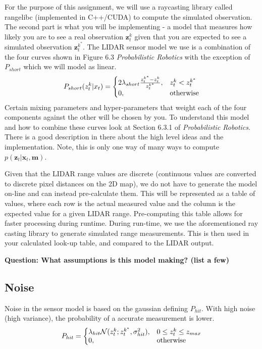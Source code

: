 \documentclass[final]{article}
\begin{document}
For the purpose of this assignment, we will use a raycasting library called rangelibc (implemented in C++/CUDA) to compute the simulated observation. The second part is what you will be implementing - a model that measures how likely you are to see a real observation $\mathbf{z}^k_t$ given that you are expected to see a simulated observation $\mathbf{z}_t^{k^*}$. The LIDAR sensor model we use is a combination of the four curves shown in Figure 6.3 \textit{Probabilistic Robotics} with the exception of \(P_{short}\) which we will model as linear. 
\[
P_{short}(z_t^k | x_t) = \left\{
\begin{array}{@{}ll@{}}
2\lambda_{short} \frac{z_t^{k^*} - z_t^k}{z_t^{k^*}}, & z_t^k < z_t^{k^*}\\
0, &\text{otherwise}
\end{array}\right.
\]
Certain mixing parameters and hyper-parameters that weight each of the four components against the other will be chosen by you. To understand this model and how to combine these curves look at Section 6.3.1 of \textit{Probabilistic Robotics}. There is a good description in there about the high level ideas and the implementation. Note, this is only one way of many ways to compute $p(\mathbf{z}_t | \mathbf{x}_t,\mathbf{m})$.

Given that the LIDAR range values are discrete (continuous values are converted to discrete pixel distances on the 2D map), we do not have to generate the model on-line and can instead pre-calculate them. This will be represented as a table of values, where each row is the actual measured value and the column is the expected value for a given LIDAR range. Pre-computing this table allows for faster processing during runtime. During run-time, we use the aforementioned ray casting library to generate simulated range measurements. This is then used in your calculated look-up table, and compared to the LIDAR output.

\textbf{Question: What assumptions is this model making? (list a few)}
\subsection{Noise}
Noise in the sensor model is based on the gaussian defining \(P_{hit}\). With high noise (high variance), the probability of a accurate measurement is lower.
\[
P_{hit}=\left\{
\begin{array}{@{}ll@{}}
\lambda_{hit} \mathcal{N}(z_t^k;z_t^{k^*},\sigma_{hit}^2), & 0 \leq z_t^k \leq z_{max}\\
0, &\text{otherwise}
\end{array}\right.
\]
\end{document}
